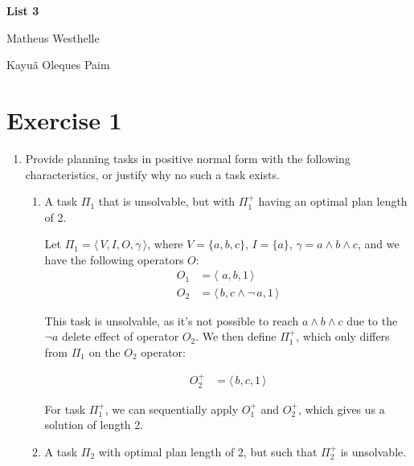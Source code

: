 \documentclass[11pt]{article}
\begin{document}
\begin{titlepage}
    \thispagestyle{firstpage}
    \vspace*{1in}
    \begin{center}
      {\LARGE\bfseries List 3 \par}
      \vspace{0.2in}
      {\large Matheus Westhelle \par}
      {\large Kayuã Oleques Paim \par}
    \end{center}

\section*{Exercise 1}

\begin{enumerate}[label=(\alph*)]
\item Provide planning tasks in positive normal form with the following characteristics, or justify
why no such a task exists.
\begin{enumerate}[label=(\roman*)]
\item A task $\Pi_1$ that is unsolvable, but with $\Pi^{+}_1$ having an optimal plan length of 2. \par
\vspace{5mm}
Let $\Pi_1 = \langle \, V, I, O, \gamma \, \rangle$, where $V = \{ a, b, c \}$,
$I = \{ a \}$,
$\gamma = a \land b \land c$, and we have
the following operators $O$:
\begin{align*}
    O_1 &= \langle \, \,a, b, 1 \, \rangle \\
    O_2 &= \langle \, b, c \land \neg\,a, 1 \, \rangle
\end{align*}

This task is unsolvable, as it's not possible to reach $a \land b \land c$ due to the $\neg a$ delete
effect of operator $O_2$. We then define $\Pi_1^{+}$, which only differs from $\Pi_1$ on
the $O_2$ operator:

\begin{align*}
    O_2^{+} &= \langle \, b, c, 1 \, \rangle
\end{align*}

\noindent For task $\Pi_1^{+}$, we can sequentially apply $O_1^{+}$ and $O_2^{+}$, which gives us a solution of length 2.

\item A task $\Pi_2$ with optimal plan length of 2, but such that $\Pi_2^{+}$ is unsolvable.
\vspace{5mm}


\end{enumerate}
\end{enumerate}
\end{titlepage}
\end{document}
